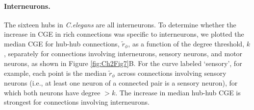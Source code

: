 \paragraph{Interneurons.}
The sixteen hubs in \textit{C.elegans} are all interneurons.
To determine whether the increase in CGE in rich connections was specific to interneurons, we plotted the median CGE for hub-hub connections, $\tilde{r}_\phi$, as a function of the degree threshold, $k$, separately for connections involving interneurons, sensory neurons, and motor neurons, as shown in Figure \ref{fig:Ch2Fig7}B.
For the curve labeled `sensory', for example, each point is the median $\tilde{r}_\phi$ across connections involving sensory neurons (i.e., at least one neuron of a connected pair is a sensory neuron), for which both neurons have degree $>k$.
The increase in median hub-hub CGE is strongest for connections involving interneurons.
